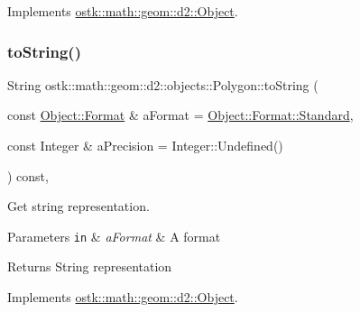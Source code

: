 Implements \hyperlink{classostk_1_1math_1_1geom_1_1d2_1_1_object_ae05ad883ed5a560e38f0aae7a4adc1ea}{ostk\+::math\+::geom\+::d2\+::\+Object}.

\mbox{\label{classostk_1_1math_1_1geom_1_1d2_1_1objects_1_1_polygon_a6e672ccf5f1101de80e636f097f0a0f7}} 
\subsubsection{\texorpdfstring{to\+String()}{toString()}}
{\footnotesize\ttfamily String ostk\+::math\+::geom\+::d2\+::objects\+::\+Polygon\+::to\+String (\begin{DoxyParamCaption}\item[{const \hyperlink{classostk_1_1math_1_1geom_1_1d2_1_1_object_aa76f9e30caebf4005bafbdff447f66cf}{Object\+::\+Format} \&}]{a\+Format = {\ttfamily \hyperlink{classostk_1_1math_1_1geom_1_1d2_1_1_object_aa76f9e30caebf4005bafbdff447f66cfaeb6d8ae6f20283755b339c0dc273988b}{Object\+::\+Format\+::\+Standard}},  }\item[{const Integer \&}]{a\+Precision = {\ttfamily Integer\+:\+:Undefined()} }\end{DoxyParamCaption}) const\hspace{0.3cm}{\ttfamily [override]}, {\ttfamily [virtual]}}



Get string representation. 


\begin{DoxyParams}[1]{Parameters}
\mbox{\tt in}  & {\em a\+Format} & A format \\
\hline
\end{DoxyParams}
\begin{DoxyReturn}{Returns}
String representation 
\end{DoxyReturn}


Implements \hyperlink{classostk_1_1math_1_1geom_1_1d2_1_1_object_ada4c2187dd24ef02b91b6346191f677c}{ostk\+::math\+::geom\+::d2\+::\+Object}.

\mbox{\label{classostk_1_1math_1_1geom_1_1d2_1_1objects_1_1_polygon_af260e109c9315fd31f7f24f3154dcbf2}} 
